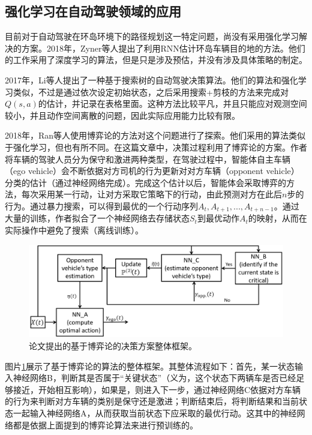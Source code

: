 \documentclass[degree=bachelor, tocarialchapter, pifootnote]{thuthesis}
\begin{document}
  \subsection{强化学习在自动驾驶领域的应用}
    目前对于自动驾驶在环岛环境下的路径规划这一特定问题，尚没有采用强化学习解决的方案。2018年，Zyner等人提出了利用RNN估计环岛车辆目的地的方法\cite{RNN_predict_driver_intention}。他们的工作采用了深度学习的算法，但是只是涉及预估，并没有涉及具体策略的制定。\par
    2017年，Li等人提出了一种基于搜索树的自动驾驶决策算法\cite{explicit_decision_tree}。他们的算法和强化学习类似，不过是通过依次设定初始状态，之后采用搜索+剪枝的方法来完成对$Q(s, a)$的估计，并记录在表格里面。这种方法比较平凡，并且只能应对观测空间较小，并且动作空间离散的问题，因此实际应用能力比较有限。\par
    2018年，Ran等人使用博弈论的方法对这个问题进行了探索\cite{game_theory}。他们采用的算法类似于强化学习，但也有所不同。在这篇文章中，决策过程利用了博弈论的方案。作者将车辆的驾驶人员分为保守和激进两种类型，在驾驶过程中，智能体自主车辆（ego vehicle）会不断依据对方司机的行为更新对对方车辆（opponent vehicle）分类的估计（通过神经网络完成）。完成这个估计以后，智能体会采取博弈的方法，每次采用某一行动，让对方采取它策略下的行动，由此预测对方在此后$n$步的行为。通过暴力搜索，可以得到最优的一个行动序列$A_t, A_{t+1}, ..., A_{t+n-1}$。通过大量的训练，作者拟合了一个神经网络去存储状态$S_t$到最优动作$A_t$的映射，从而在实际操作中避免了搜索（离线训练）。
    \begin{figure}[H] %
        \centering
        \includegraphics[scale=1.5]{game_theory_structure}
        \caption{论文\cite{game_theory}提出的基于博弈论的决策方案整体框架。}
        \label{fig:game_theory_structure}
    \end{figure}
    \par 图片\ref{fig:game_theory_structure}展示了基于博弈论的算法的整体框架。其整体流程如下：首先，某一状态输入神经网络B，判断其是否属于``关键状态''（义为，这个状态下两辆车是否已经足够接近，开始相互影响），如果是，则进入下一步，通过神经网络C依据对方车辆的行为来判断对方车辆的类别是保守还是激进；判断结束后，将判断结果和当前状态一起输入神经网络A，从而获取当前状态下应采取的最优行动。这其中的神经网络都是依据上面提到的博弈论算法来进行预训练的。\par
\end{document}
